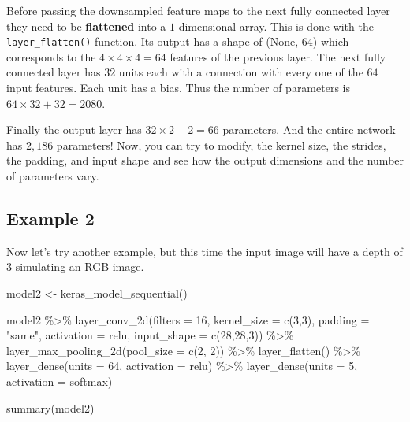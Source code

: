 \documentclass[
  11pt,
]{krantz}
\newenvironment{Shaded}{\begin{snugshade}}{\end{snugshade}}
\newcommand{\AttributeTok}[1]{\textcolor[rgb]{0.61,0.61,0.61}{#1}}
\newcommand{\DecValTok}[1]{\textcolor[rgb]{0.06,0.06,0.06}{#1}}
\newcommand{\FunctionTok}[1]{\textcolor[rgb]{0,0,0}{#1}}
\newcommand{\NormalTok}[1]{#1}
\newcommand{\OtherTok}[1]{\textcolor[rgb]{0.37,0.37,0.37}{#1}}
\newcommand{\SpecialCharTok}[1]{\textcolor[rgb]{0,0,0}{#1}}
\newcommand{\StringTok}[1]{\textcolor[rgb]{0.5,0.5,0.5}{#1}}
\begin{document}
Before passing the downsampled feature maps to the next fully connected layer they need to be \textbf{flattened} into a \(1\)-dimensional array. This is done with the \texttt{layer\_flatten()} function. Its output has a shape of (None, 64) which corresponds to the \(4 \times 4 \times 4 =64\) features of the previous layer. The next fully connected layer has \(32\) units each with a connection with every one of the \(64\) input features. Each unit has a bias. Thus the number of parameters is \(64 \times 32 + 32 = 2080\).

Finally the output layer has \(32 \times 2 + 2=66\) parameters. And the entire network has \(2,186\) parameters! Now, you can try to modify, the kernel size, the strides, the padding, and input shape and see how the output dimensions and the number of parameters vary.

\hypertarget{example-2}{%
\subsection{Example 2}\label{example-2}}

Now let's try another example, but this time the input image will have a depth of \(3\) simulating an RGB image.

\begin{Shaded}
\begin{Highlighting}[]
\NormalTok{model2 }\OtherTok{\textless{}{-}} \FunctionTok{keras\_model\_sequential}\NormalTok{()}

\NormalTok{model2 }\SpecialCharTok{\%\textgreater{}\%}
  \FunctionTok{layer\_conv\_2d}\NormalTok{(}\AttributeTok{filters =} \DecValTok{16}\NormalTok{,}
                \AttributeTok{kernel\_size =} \FunctionTok{c}\NormalTok{(}\DecValTok{3}\NormalTok{,}\DecValTok{3}\NormalTok{),}
                \AttributeTok{padding =} \StringTok{"same"}\NormalTok{,}
                \AttributeTok{activation =} \StringTok{\textquotesingle{}relu\textquotesingle{}}\NormalTok{,}
                \AttributeTok{input\_shape =} \FunctionTok{c}\NormalTok{(}\DecValTok{28}\NormalTok{,}\DecValTok{28}\NormalTok{,}\DecValTok{3}\NormalTok{)) }\SpecialCharTok{\%\textgreater{}\%}
  \FunctionTok{layer\_max\_pooling\_2d}\NormalTok{(}\AttributeTok{pool\_size =} \FunctionTok{c}\NormalTok{(}\DecValTok{2}\NormalTok{, }\DecValTok{2}\NormalTok{)) }\SpecialCharTok{\%\textgreater{}\%}
  \FunctionTok{layer\_flatten}\NormalTok{() }\SpecialCharTok{\%\textgreater{}\%}
  \FunctionTok{layer\_dense}\NormalTok{(}\AttributeTok{units =} \DecValTok{64}\NormalTok{, }\AttributeTok{activation =} \StringTok{\textquotesingle{}relu\textquotesingle{}}\NormalTok{) }\SpecialCharTok{\%\textgreater{}\%}
  \FunctionTok{layer\_dense}\NormalTok{(}\AttributeTok{units =} \DecValTok{5}\NormalTok{, }\AttributeTok{activation =} \StringTok{\textquotesingle{}softmax\textquotesingle{}}\NormalTok{)}

\FunctionTok{summary}\NormalTok{(model2)}
\end{Highlighting}
\end{Shaded}
\end{document}
